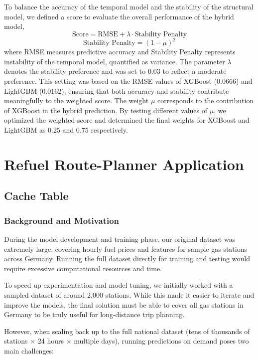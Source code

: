 To balance the accuracy of the temporal model and the stability of the structural model, we defined a score to evaluate the overall performance of the hybrid model,
\begin{equation}
\text{Score} = \text{RMSE} + \lambda \cdot \text{Stability Penalty}
\end{equation}
\begin{equation}
\text{Stability Penalty} = (1-\mu)^2
\end{equation}
where RMSE measures predictive accuracy and Stability Penalty represents instability of the temporal model, quantified as variance. The parameter $\lambda$ denotes the stability preference and was set to 0.03 to reflect a moderate preference. This setting was based on the RMSE values of XGBoost (0.0666) and LightGBM (0.0162), ensuring that both accuracy and stability contribute meaningfully to the weighted score. The weight $\mu$ corresponds to the contribution of XGBoost in the hybrid prediction. By testing different values of $\mu$, we optimized the weighted score and determined the final weights for XGBoost and LightGBM as 0.25 and 0.75 respectively.


\chapter{Refuel Route-Planner Application}
\section{Cache Table}

\subsection{Background and Motivation}
During the model development and training phase, our original dataset was extremely large, covering hourly fuel prices and features for sample gas stations across Germany. Running the full dataset directly for training and testing would require excessive computational resources and time.

To speed up experimentation and model tuning, we initially worked with a sampled dataset of around 2{,}000 stations. While this made it easier to iterate and improve the models, the final solution must be able to cover all gas stations in Germany to be truly useful for long-distance trip planning.

However, when scaling back up to the full national dataset (tens of thousands of stations $\times$ 24 hours $\times$ multiple days), running predictions on demand poses two main challenges:

